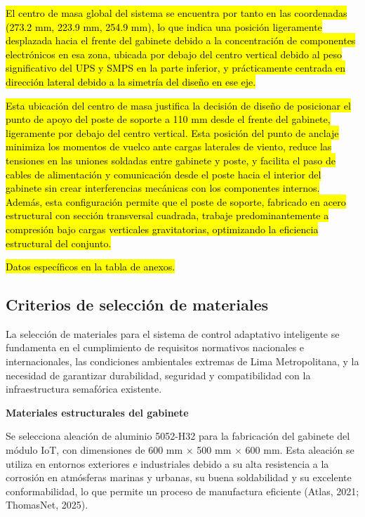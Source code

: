 \documentclass[12pt,a4paper,oneside]{report}
\begin{document}
\hl{El centro de masa global del sistema se encuentra por tanto en las coordenadas (273.2 mm, 223.9 mm, 254.9 mm), lo que indica una posición ligeramente desplazada hacia el frente del gabinete debido a la concentración de componentes electrónicos en esa zona, ubicada por debajo del centro vertical debido al peso significativo del UPS y SMPS en la parte inferior, y prácticamente centrada en dirección lateral debido a la simetría del diseño en ese eje.}

\hl{Esta ubicación del centro de masa justifica la decisión de diseño de posicionar el punto de apoyo del poste de soporte a 110 mm desde el frente del gabinete, ligeramente por debajo del centro vertical. Esta posición del punto de anclaje minimiza los momentos de vuelco ante cargas laterales de viento, reduce las tensiones en las uniones soldadas entre gabinete y poste, y facilita el paso de cables de alimentación y comunicación desde el poste hacia el interior del gabinete sin crear interferencias mecánicas con los componentes internos. Además, esta configuración permite que el poste de soporte, fabricado en acero estructural con sección transversal cuadrada, trabaje predominantemente a compresión bajo cargas verticales gravitatorias, optimizando la eficiencia estructural del conjunto.}

\hl{Datos específicos en la tabla de anexos.}

\subsection{Criterios de selección de materiales}\label{criterios-de-selecciuxf3n-de-materiales}

La selección de materiales para el sistema de control adaptativo inteligente se fundamenta en el cumplimiento de requisitos normativos nacionales e internacionales, las condiciones ambientales extremas de Lima Metropolitana, y la necesidad de garantizar durabilidad, seguridad y compatibilidad con la infraestructura semafórica existente.

\textbf{Materiales estructurales del gabinete}

Se selecciona aleación de aluminio 5052-H32 para la fabricación del gabinete del módulo IoT, con dimensiones de 600 mm \ensuremath{\times} 500 mm \ensuremath{\times} 600 mm. Esta aleación se utiliza en entornos exteriores e industriales debido a su alta resistencia a la corrosión en atmósferas marinas y urbanas, su buena soldabilidad y su excelente conformabilidad, lo que permite un proceso de manufactura eficiente (Atlas, 2021; ThomasNet, 2025).
\end{document}
